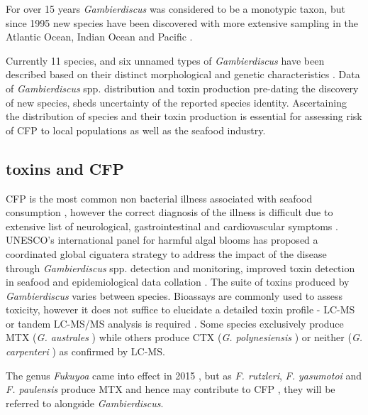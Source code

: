 \documentclass[12pt]{article}
\begin{document}
For over 15 years \emph{Gambierdiscus} was considered to be a monotypic taxon, but since 1995 new species have been discovered with more extensive sampling in the Atlantic Ocean, Indian Ocean and Pacific \cite{faust1995observation,holmes1998gambierdiscus,litaker2009taxonomy,chinain1999morphology,fraga2011gambierdiscus,nishimura2014morphology}.

Currently 11 species, and six unnamed types of \emph{Gambierdiscus} have been described based on their distinct morphological and genetic characteristics \cite{adachi1979thecal,faust1995observation,chinain1999morphology,litaker2009taxonomy,nishimura2014morphology,fraga2011gambierdiscus}. Data of \emph{Gambierdiscus} spp. distribution and toxin production pre-dating the discovery of new species, sheds uncertainty of the reported species identity. Ascertaining the distribution of species and their toxin production is essential for assessing risk of CFP to local populations as well as the seafood industry.

\subsection{toxins and CFP}
CFP is the most common non bacterial illness associated with seafood consumption \cite{friedman2008ciguatera}, however the correct diagnosis of the illness is difficult due to extensive list of neurological, gastrointestinal and cardiovascular symptoms \cite{sims1987theoretical}. UNESCO's international panel for harmful algal blooms has proposed a coordinated global ciguatera strategy to address the impact of the disease through \emph{Gambierdiscus} spp. detection and monitoring, improved toxin detection in seafood and epidemiological data collation \cite{globalcig}.
The suite of toxins produced by \emph{Gambierdiscus} varies between species. Bioassays are commonly used to assess toxicity, however it does not suffice to elucidate a detailed toxin profile - LC-MS or tandem LC-MS/MS analysis is required \cite{diogened2014chemistry}. Some species exclusively produce MTX (\emph{G. australes} \cite{rhodes2014production}) while others produce CTX (\emph{G. polynesiensis} \cite{rhodes2014production}) or neither (\emph{G. carpenteri} \cite{kohli2014high}) as confirmed by LC-MS. 

The genus \emph{Fukuyoa} came into effect in 2015 \cite{gomez2015fukuyoa}, but as \emph{F. rutzleri}, \emph{F. yasumotoi} and \emph{F. paulensis} produce MTX and hence may contribute to CFP \cite{kohli2014feeding}, they will be referred to alongside \emph{Gambierdiscus}.
\end{document}
